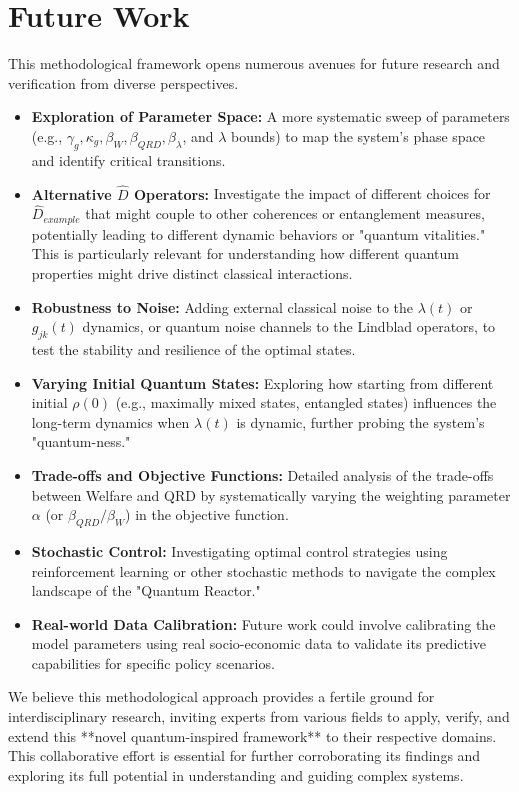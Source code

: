 \documentclass[9pt]{article}
\begin{document}
\section{Future Work}
This methodological framework opens numerous avenues for future research and verification from diverse perspectives.
\begin{itemize}
    \item \textbf{Exploration of Parameter Space:} A more systematic sweep of parameters (e.g., $\gamma_g, \kappa_g, \beta_W, \beta_{QRD}, \beta_\lambda$, and $\lambda$ bounds) to map the system's phase space and identify critical transitions.
    \item \textbf{Alternative \texorpdfstring{$\hat{D}$}{D} Operators:} Investigate the impact of different choices for $\hat{D}_{example}$ that might couple to other coherences or entanglement measures, potentially leading to different dynamic behaviors or "quantum vitalities." This is particularly relevant for understanding how different quantum properties might drive distinct classical interactions.
    \item \textbf{Robustness to Noise:} Adding external classical noise to the $\lambda(t)$ or $g_{jk}(t)$ dynamics, or quantum noise channels to the Lindblad operators, to test the stability and resilience of the optimal states.
    \item \textbf{Varying Initial Quantum States:} Exploring how starting from different initial $\rho(0)$ (e.g., maximally mixed states, entangled states) influences the long-term dynamics when $\lambda(t)$ is dynamic, further probing the system's "quantum-ness."
    \item \textbf{Trade-offs and Objective Functions:} Detailed analysis of the trade-offs between Welfare and QRD by systematically varying the weighting parameter $\alpha$ (or $\beta_{QRD}/\beta_W$) in the objective function.
    \item \textbf{Stochastic Control:} Investigating optimal control strategies using reinforcement learning or other stochastic methods to navigate the complex landscape of the "Quantum Reactor."
    \item \textbf{Real-world Data Calibration:} Future work could involve calibrating the model parameters using real socio-economic data to validate its predictive capabilities for specific policy scenarios.
\end{itemize}
We believe this methodological approach provides a fertile ground for interdisciplinary research, inviting experts from various fields to apply, verify, and extend this **novel quantum-inspired framework** to their respective domains. This collaborative effort is essential for further corroborating its findings and exploring its full potential in understanding and guiding complex systems.
\end{document}
